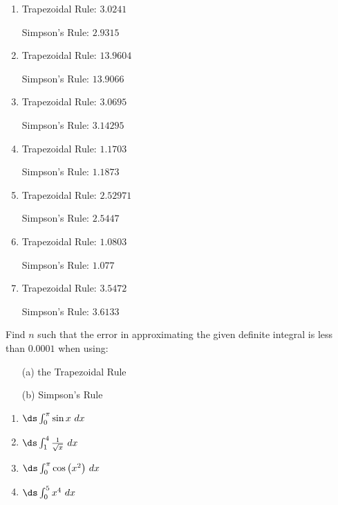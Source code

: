 \begin{enumialphparenastyle}
\begin{ex}
\begin{sol}
\begin{enumerate}
{Simpson's Rule: $0.90452$
}
\item {Trapezoidal Rule: 	$3.0241$

Simpson's Rule: $2.9315$
}
\item {Trapezoidal Rule: 	$13.9604$

Simpson's Rule: $13.9066$
}
\item {Trapezoidal Rule: 	$3.0695$

Simpson's Rule: $3.14295$
}
\item 
{Trapezoidal Rule: 	$1.1703$

Simpson's Rule: $1.1873$
}
\item {Trapezoidal Rule: 	$2.52971$

Simpson's Rule: $2.5447$
}
\item {Trapezoidal Rule: 	$1.0803$

Simpson's Rule: $1.077$
}
\item {Trapezoidal Rule: 	$3.5472$

Simpson's Rule: $3.6133$
}
\end{enumerate}
\end{sol}

\end{ex}
\begin{ex}
Find $n$ such that the error in approximating the given definite integral is less than $0.0001$ when using:
\begin{enumerate}
\item [(a)] the Trapezoidal Rule
\item [(b)] Simpson's Rule
\end{enumerate}
\begin{enumerate}
\item {$\ds \int_{0}^{\pi} \sin x \ dx$}

\item {$\ds \int_{1}^{4} \frac{1}{\sqrt x} \ dx$}

\item {$\ds \int_{0}^{\pi} \cos \big(x^2\big) \ dx$}

\item {$\ds \int_{0}^{5} x^4 \ dx$}

\end{enumerate}


\end{ex}
\end{enumialphparenastyle}
